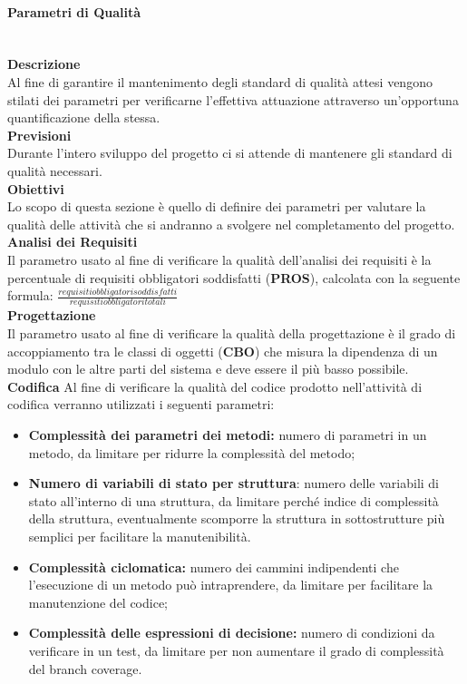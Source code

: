 \paragraph{Parametri di Qualità}
\\\textbf{Descrizione}\\
Al fine di garantire il mantenimento degli standard di qualità attesi vengono stilati dei parametri per verificarne l'effettiva attuazione attraverso un'opportuna quantificazione della stessa.
\\\textbf{Previsioni}\\
Durante l'intero sviluppo del progetto ci si attende di mantenere gli standard di qualità necessari.
\\\textbf{Obiettivi}\\
Lo scopo di questa sezione è quello di definire dei parametri per valutare la qualità delle attività che si andranno a svolgere nel completamento del progetto.
\\\textbf{Analisi dei Requisiti}\\
Il parametro usato al fine di verificare la qualità dell'analisi dei requisiti è la percentuale di requisiti obbligatori soddisfatti (\textbf{PROS}), calcolata con la seguente formula:
$\frac{requisiti obbligatori soddisfatti}{requisiti obbligatori totali}$
\\\textbf{Progettazione}\\
Il parametro usato al fine di verificare la qualità della progettazione è il grado di accoppiamento tra le classi di oggetti (\textbf{CBO}) che misura la dipendenza di un modulo con le altre parti del sistema e deve essere il più basso possibile.
\\\textbf{Codifica}
Al fine di verificare la qualità del codice prodotto nell'attività di codifica verranno utilizzati i seguenti parametri:
\begin{itemize}
	\item \textbf{Complessità dei parametri dei metodi:} numero di parametri in un metodo, da limitare per ridurre la complessità del metodo;
	\item \textbf{Numero di variabili di stato per struttura}: numero delle variabili di stato all'interno di una struttura, da limitare perché indice di complessità della struttura, eventualmente scomporre la struttura in sottostrutture più semplici per facilitare la manutenibilità.
	\item \textbf{Complessità ciclomatica:} numero dei cammini indipendenti che l'esecuzione di un metodo può intraprendere, da limitare per facilitare la manutenzione del codice;
	\item \textbf{Complessità delle espressioni di decisione:} numero di condizioni da verificare in un test, da limitare per non aumentare il grado di complessità del branch coverage.
\end{itemize}

